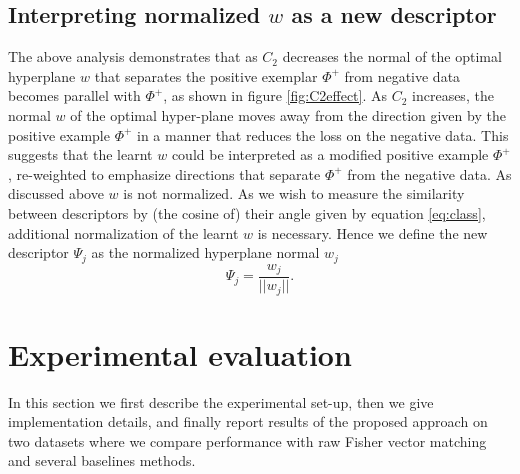 \documentclass[10pt,twocolumn,letterpaper]{article}
\begin{document}
   \subsection*{Interpreting normalized $w$ as a new descriptor} %
      The above analysis demonstrates that as $C_2$ decreases the normal of the optimal hyperplane $w$ that separates the positive exemplar $\Phi^+$ from negative data becomes parallel with $\Phi^+$, as shown in figure \ref{fig:C2effect}. As $C_2$ increases, the normal $w$ of the optimal hyper-plane moves away from the direction given by the positive example $\Phi^+$ in a manner that reduces the loss on the negative data. 
      This suggests that the learnt $w$ could be interpreted as a modified positive example $\Phi^+$, re-weighted to emphasize directions that separate $\Phi^+$ from the negative data. As discussed above $w$ is not normalized. As we wish to measure the similarity between descriptors by (the cosine of) their angle        
      given by equation \eqref{eq:class}, additional normalization of the learnt $w$ is necessary. Hence we define the new descriptor $\Psi_j$ as the normalized hyperplane normal $w_j$
         \begin{equation}
            \label{eq:normalization}
            \Psi_j=\dfrac{w_j}{||w_j||}.
         \end{equation}



\section{Experimental evaluation}
\label{sec:exp}
   In this section we first describe the experimental set-up, then we give implementation details, and finally report results of the proposed approach on two datasets where we compare performance with raw Fisher vector matching and several baselines methods. 
\end{document}
